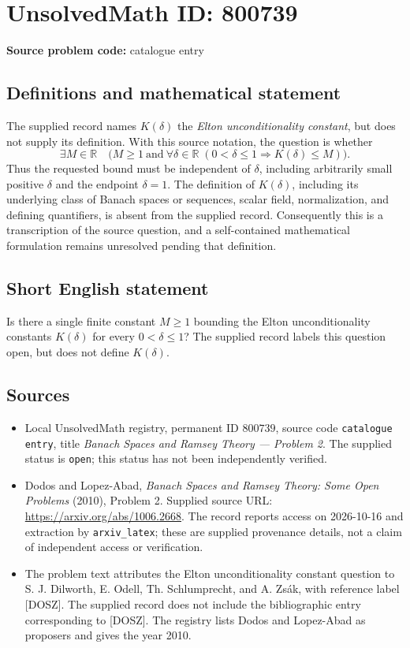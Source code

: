 \documentclass[11pt]{article}
\newcommand{\R}{\mathbb{R}}
\begin{document}
\section*{UnsolvedMath ID: 800739}
\textbf{Source problem code:} catalogue entry
\subsection{Definitions and mathematical statement}
The supplied record names \(K(\delta)\) the \emph{Elton unconditionality constant}, but does not supply its definition. With this source notation, the question is whether
\[
\exists M\in\R\quad\bigl(M\geq 1\ \text{and}\ \forall\delta\in\R\; (0<\delta\leq 1\Longrightarrow K(\delta)\leq M)\bigr).
\]
Thus the requested bound must be independent of \(\delta\), including arbitrarily small positive \(\delta\) and the endpoint \(\delta=1\). The definition of \(K(\delta)\), including its underlying class of Banach spaces or sequences, scalar field, normalization, and defining quantifiers, is absent from the supplied record. Consequently this is a transcription of the source question, and a self-contained mathematical formulation remains unresolved pending that definition.
\subsection{Short English statement}
Is there a single finite constant \(M\geq 1\) bounding the Elton unconditionality constants \(K(\delta)\) for every \(0<\delta\leq 1\)? The supplied record labels this question open, but does not define \(K(\delta)\).
\subsection{Sources}
\begin{itemize}
\item Local UnsolvedMath registry, permanent ID \(800739\), source code \texttt{catalogue entry}, title \emph{Banach Spaces and Ramsey Theory --- Problem 2}. The supplied status is \texttt{open}; this status has not been independently verified.
\item Dodos and Lopez-Abad, \emph{Banach Spaces and Ramsey Theory: Some Open Problems} (2010), Problem 2. Supplied source URL: \url{https://arxiv.org/abs/1006.2668}. The record reports access on 2026-10-16 and extraction by \texttt{arxiv\_latex}; these are supplied provenance details, not a claim of independent access or verification.
\item The problem text attributes the Elton unconditionality constant question to S. J. Dilworth, E. Odell, Th. Schlumprecht, and A. Zs\'{a}k, with reference label [DOSZ]. The supplied record does not include the bibliographic entry corresponding to [DOSZ]. The registry lists Dodos and Lopez-Abad as proposers and gives the year 2010.
\end{itemize}
\end{document}
